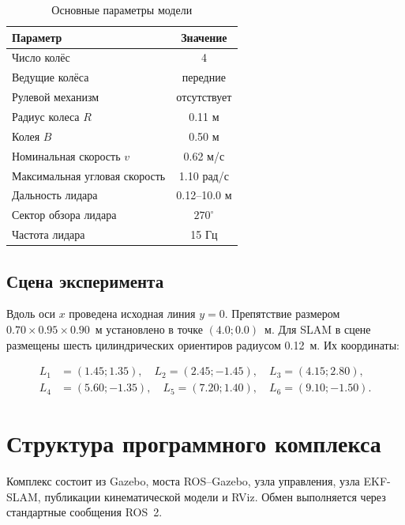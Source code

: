 \documentclass[a4paper,12pt]{article}
\begin{document}
\begin{table}[H]
\centering
\caption{Основные параметры модели}
\begin{tabular}{>{\raggedright\arraybackslash}p{}c}
\toprule
Параметр & Значение \\
\midrule
Число колёс & 4 \\
Ведущие колёса & передние \\
Рулевой механизм & отсутствует \\
Радиус колеса $R$ & 0.11 м \\
Колея $B$ & 0.50 м \\
Номинальная скорость $v$ & 0.62 м/с \\
Максимальная угловая скорость & 1.10 рад/с \\
Дальность лидара & 0.12--10.0 м \\
Сектор обзора лидара & $270^\circ$ \\
Частота лидара & 15 Гц \\
\bottomrule
\end{tabular}
\end{table}

\subsection{Сцена эксперимента}

Вдоль оси $x$ проведена исходная линия $y=0$. Препятствие размером
$0.70\times0.95\times0.90$~м установлено в точке $(4.0;0.0)$~м. Для SLAM в
сцене размещены шесть цилиндрических ориентиров радиусом 0.12~м. Их координаты:

\[
\begin{split}
L_1&=(1.45;1.35),\quad L_2=(2.45;-1.45),\quad L_3=(4.15;2.80),\\
L_4&=(5.60;-1.35),\quad L_5=(7.20;1.40),\quad L_6=(9.10;-1.50).
\end{split}
\]

\section{Структура программного комплекса}

Комплекс состоит из Gazebo, моста ROS--Gazebo, узла управления, узла EKF-SLAM,
публикации кинематической модели и RViz. Обмен выполняется через стандартные
сообщения ROS~2.
\end{document}
